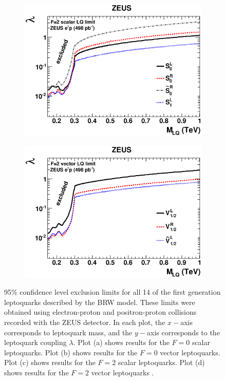 \begin{figure}
\begin{subfigure}[b]{0.49\textwidth}
    \includegraphics[width=\textwidth]{tex/theory/fig/limits/DESY-12-077_14.eps}
    \caption{}
    \label{fig:hera-F2S}
  \end{subfigure}
  \begin{subfigure}[b]{0.49\textwidth}
    \includegraphics[width=\textwidth]{tex/theory/fig/limits/DESY-12-077_15.eps}
    \caption{}
    \label{fig:hera-F2V}
  \end{subfigure}
  \caption{95\% confidence level exclusion limits for all 14 of the 
    first generation leptoquarks described by the BRW model. 
    These limits were obtained using electron-proton and positron-proton
    collisions recorded with the ZEUS detector.
    In each plot, the $x-$axis corresponds to leptoquark mass, and the
    $y-$axis corresponds to the leptoquark coupling $\lambda$.  
    Plot (a) shows results for the $F=0$ scalar leptoquarks.
    Plot (b) shows results for the $F=0$ vector leptoquarks.
    Plot (c) shows results for the $F=2$ scalar leptoquarks.
    Plot (d) shows results for the $F=2$ vector leptoquarks \cite{zeus}.}
  \label{fig:hera-brw}
\end{figure}

